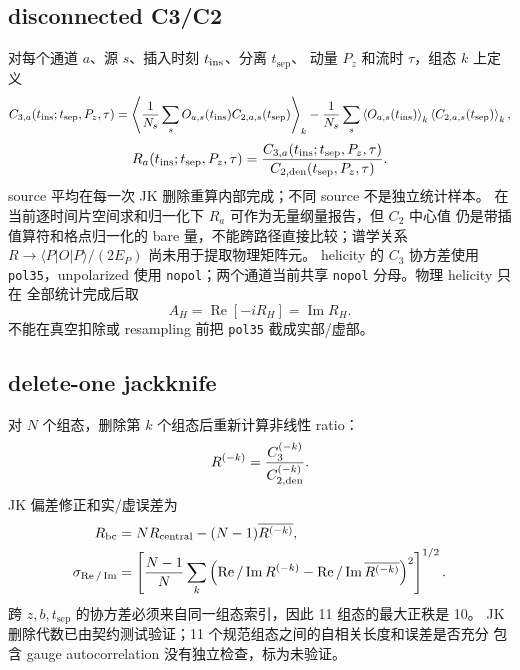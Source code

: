 \documentclass[UTF8]{ctexart}
\newcommand{\Real}{\operatorname{Re}}
\newcommand{\Imag}{\operatorname{Im}}
\newcommand{\ts}{t_{\mathrm{sep}}}
\begin{document}
\subsection{disconnected C3/C2}

对每个通道 \(a\)、源 \(s\)、插入时刻 \(t_{\rm ins}\)、分离 \(\ts\)、
动量 \(P_z\) 和流时 \(\tau\)，组态 \(k\) 上定义
\begin{equation}
C_{3,a}(t_{\rm ins};\ts,P_z,\tau)
=\left\langle\frac1{N_s}\sum_s O_{a,s}(t_{\rm ins})C_{2,a,s}(\ts)\right\rangle_k
-\frac1{N_s}\sum_s
\left\langle O_{a,s}(t_{\rm ins})\right\rangle_k
\left\langle C_{2,a,s}(\ts)\right\rangle_k,
\label{eq:disconnected-ratio}
\end{equation}
\begin{equation}
R_a(t_{\rm ins};\ts,P_z,\tau)
=\frac{C_{3,a}(t_{\rm ins};\ts,P_z,\tau)}{C_{2,\rm den}(\ts,P_z,\tau)}.
\label{eq:ratio-def}
\end{equation}
source 平均在每一次 JK 删除重算内部完成；不同 source 不是独立统计样本。
在当前逐时间片空间求和归一化下 \(R_a\) 可作为无量纲量报告，但 \(C_2\) 中心值
仍是带插值算符和格点归一化的 bare 量，不能跨路径直接比较；谱学关系
\(R\to\langle P|O|P\rangle/(2E_P)\) 尚未用于提取物理矩阵元。
helicity 的 \(C_3\) 协方差使用 \texttt{pol35}，unpolarized 使用
\texttt{nopol}；两个通道当前共享 \texttt{nopol} 分母。物理 helicity 只在
全部统计完成后取
\begin{equation}
A_H=\Real[-iR_H]=\Imag R_H.
\label{eq:helicity-phase}
\end{equation}
不能在真空扣除或 resampling 前把 \texttt{pol35} 截成实部/虚部。

\subsection{delete-one jackknife}

对 \(N\) 个组态，删除第 \(k\) 个组态后重新计算非线性 ratio：
\begin{equation}
R^{(-k)}=\frac{C_3^{(-k)}}{C_{2,\rm den}^{(-k)}}.
\label{eq:jk-ratio}
\end{equation}
JK 偏差修正和实/虚误差为
\begin{align}
R_{\rm bc}&=N R_{\rm central}-(N-1)\overline{R^{(-k)}},\\
\sigma_{\Real/\Imag}
&=\left[
\frac{N-1}{N}\sum_k
\left(\Real/\Imag R^{(-k)}
-\Real/\Imag\overline{R^{(-k)}}\right)^2
\right]^{1/2}.
\label{eq:jk-error}
\end{align}
跨 \(z,b,\ts\) 的协方差必须来自同一组态索引，因此 11 组态的最大正秩是 10。
JK 删除代数已由契约测试验证；11 个规范组态之间的自相关长度和误差是否充分
包含 gauge autocorrelation 没有独立检查，标为未验证。
\end{document}
